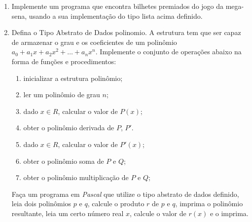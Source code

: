 \begin{enumerate}
\item Implemente um programa que encontra bilhetes premiados do jogo da mega-sena, usando a sua implementação do tipo lista acima definido.

\item Defina o Tipo Abstrato de Dados \textsf{polinomio}. A estrutura tem
que ser capaz de armazenar o grau e os coeficientes de um polinômio
$a_0 + a_1x + a_2x^2 + \ldots + a_nx^n$. Implemente o conjunto de
operações abaixo na forma de funções e procedimentos:

\begin{enumerate}
\item inicializar a estrutura polinômio;
\item ler um polinômio de grau $n$;
\item dado $x \in R$, calcular o valor de $P(x)$;
\item obter o polinômio derivada de $P$, $P'$.
\item dado $x \in R$, calcular o valor de $P'(x)$;
\item obter o polinômio soma de $P$ e $Q$;
\item obter o polinômio multiplicação de $P$ e $Q$;
\end{enumerate}

Faça um programa em \emph{Pascal} que utilize o tipo abstrato de dados
definido, leia dois polinômios $p$ e $q$, calcule
o produto $r$ de $p$ e $q$, imprima o polinômio resultante, 
leia um certo número real $x$, calcule o valor de $r(x)$ e o imprima. 

\end{enumerate}
